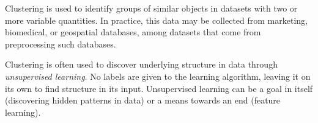 Clustering is used to identify groups of similar objects in datasets with two or more variable quantities. In practice, this data may be collected from marketing, biomedical, or geospatial databases, among datasets that come from preprocessing such databases.

Clustering is often used to discover underlying structure in data through \textit{unsupervised learning}. No labels are given to the learning algorithm, leaving it on its own to find structure in its input. Unsupervised learning can be a goal in itself (discovering hidden patterns in data) or a means towards an end (feature learning). 

